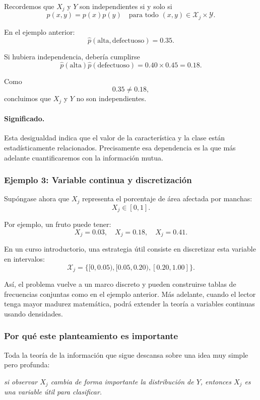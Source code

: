 \documentclass{article}
\begin{document}
Recordemos que \(X_j\) y \(Y\) son independientes si y solo si
\[
p(x,y)=p(x)p(y)
\quad \text{para todo } (x,y)\in\mathcal{X}_j\times\mathcal{Y}.
\]

En el ejemplo anterior:
\[
\widehat{p}(\text{alta},\text{defectuoso})=0.35.
\]

Si hubiera independencia, debería cumplirse
\[
\widehat{p}(\text{alta})\widehat{p}(\text{defectuoso})
=0.40\times 0.45
=0.18.
\]

Como
\[
0.35 \neq 0.18,
\]
concluimos que \(X_j\) y \(Y\) no son independientes.

\paragraph{Significado.}
Esta desigualdad indica que el valor de la característica y la clase están estadísticamente relacionados. Precisamente esa dependencia es la que más adelante cuantificaremos con la información mutua.

\subsubsection*{Ejemplo 3: Variable continua y discretización}

Supóngase ahora que \(X_j\) representa el porcentaje de área afectada por manchas:
\[
X_j \in [0,1].
\]

Por ejemplo, un fruto puede tener:
\[
X_j=0.03,\quad X_j=0.18,\quad X_j=0.41.
\]

En un curso introductorio, una estrategia útil consiste en discretizar esta variable en intervalos:
\[
\mathcal{X}_j=\{[0,0.05),[0.05,0.20),[0.20,1.00]\}.
\]

Así, el problema vuelve a un marco discreto y pueden construirse tablas de frecuencias conjuntas como en el ejemplo anterior. Más adelante, cuando el lector tenga mayor madurez matemática, podrá extender la teoría a variables continuas usando densidades.

\subsubsection*{Por qué este planteamiento es importante}

Toda la teoría de la información que sigue descansa sobre una idea muy simple pero profunda:

\begin{center}
\emph{si observar \(X_j\) cambia de forma importante la distribución de \(Y\), entonces \(X_j\) es una variable útil para clasificar.}
\end{center}
\end{document}
